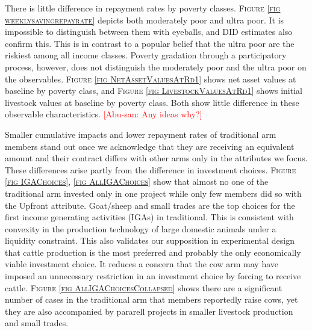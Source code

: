 	There is little difference in repayment rates by poverty classes. \textsc{\footnotesize Figure \ref{fig weeklysavingrepayrate}} depicts both moderately poor and ultra poor. It is impossible to distinguish between them with eyeballs, and DID estimates also confirm this. This is in contrast to a popular belief that the ultra poor are the riskiest among all income classes. Poverty gradation through a participatory process, however, does not distinguish the moderately poor and the ultra poor on the observables. \textsc{\footnotesize Figure \ref{fig NetAssetValuesAtRd1}} shows net asset values at baseline by poverty class, and \textsc{\footnotesize Figure \ref{fig LivestockValuesAtRd1}} shows initial livestock values at baseline by poverty class. Both show little difference in these observable characteristics. \textcolor{red}{[Abu-san: Any ideas why?]}


	Smaller cumulative impacts and lower repayment rates of \textsf{traditional} arm members stand out once we acknowledge that they are receiving an equivalent amount and their contract differs with other arms only in the attributes we focus. These differences arise partly from the difference in investment choices. \textsc{\small Figure \ref{fig IGAChoices}, \ref{fig AllIGAChoices}} show that almost no one of the \textsf{traditional} arm invested only in one project while only few members did so with the \textsf{Upfront} attribute. Goat/sheep and small trades are the top choices for the first income generating activities (IGAs) in \textsf{traditional}. This is consistent with convexity in the production technology of large domestic animals under a liquidity constraint. This also validates our supposition in experimental design that cattle production is the most preferred and probably the only economically viable investment choice. It reduces a concern that the \textsf{cow} arm may have imposed an unnecessary restriction in an investment choice by forcing to receive cattle. \textsc{\small Figure \ref{fig AllIGAChoicesCollapsed}} shows there are a significant number of cases in the \textsf{traditional} arm that members reportedly raise cows, yet they are also accompanied by pararell projects in smaller livestock production and small trades. 




